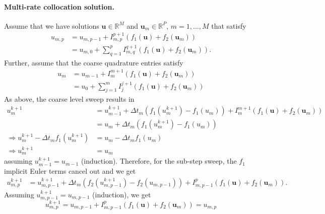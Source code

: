 \documentclass{article}
\newcommand{\ve}[1]{\mathbf{#1}}
\begin{document}
\paragraph{Multi-rate collocation solution.}
Assume that we have solutions $\ve{u} \in \mathbb{R}^{M}$ and $\ve{u}_m \in \mathbb{R}^{P}$, $m=1, \ldots, M$ that satisfy
\begin{align*}
	u_{m,p} &= u_{m,p-1} + I_{m,p}^{p+1} \left( f_1(\ve{u}) + f_2(\ve{u}_m) \right) \\
			&= u_{m,0} + \sum_{q=1}^{p} I_{m,q}^{q+1} \left( f_1(\ve{u}) + f_2(\ve{u}_m) \right).
\end{align*}
Further, assume that the coarse quadrature entries satisfy
\begin{align*}
	u_{m} &= u_{m-1} + I_{m}^{m+1} \left( f_1(\ve{u}) + f_2(\ve{u}_m) \right) \\
		  &= u_0 + \sum_{j=1}^{m} I_{j}^{j+1} \left( f_1(\ve{u}) + f_2(\ve{u}_m) \right)
\end{align*}
As above, the coarse level sweep results in
\begin{align*}
	u_{m}^{k+1} &= u^{k+1}_{m-1} + \Delta t_m \left( f_1(u^{k+1}_m) - f_1(u_m) \right) + I_m^{m+1}\left( f_1(\ve{u}) + f_2(\ve{u}_m) \right) \\
				&= u_{m} + \Delta t_m \left( f_1(u^{k+1}_m) - f_1(u_m) \right) \\
\Rightarrow u^{k+1}_m - \Delta t_m f_1(u^{k+1}_{m}) &= u_m - \Delta t_m f_1(u_m) \\
\Rightarrow u^{k+1}_m &= u_m
\end{align*}
assuming $u^{k+1}_{m-1} = u_{m-1}$ (induction).
Therefore, for the sub-step sweep, the $f_1$ implicit Euler terms cancel out and we get
\begin{align*}
	u_{m,p}^{k+1} &= u_{m,p-1}^{k+1} + \Delta t_m \left( f_2(u_{m,p-1}^{k+1}) - f_2(u_{m,p-1}) \right) + I_{m,p-1}^{p} \left( f_1(\ve{u}) + f_2(\ve{u}_m) \right).
\end{align*}
Assuming $u^{k+1}_{m,p-1} = u_{m,p-1}$ (induction), we get
\begin{equation}
	u_{m,p}^{k+1} = u_{m,p-1} + I_{m,p-1}^{p} \left( f_1(\ve{u}) + f_2(\ve{u}_m) \right) = u_{m,p}
\end{equation}

\end{document}
